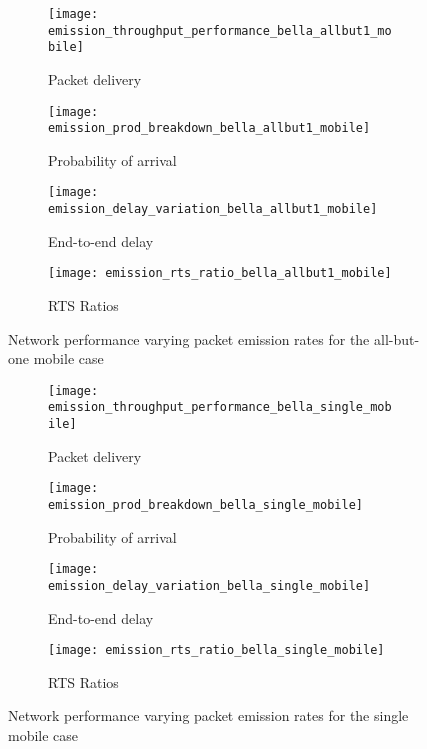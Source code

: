 \begin{figure}[tp!]
	\begin{subfigure}[t]{0.5\textwidth}
		\centering
		\texttt{[image: emission\_throughput\_performance\_bella\_allbut1\_mobile]}
		\caption{Packet delivery}
		\label{fig:emission_throughput_performance_bella_allbut1_mobile}
	\end{subfigure}
	\begin{subfigure}[t]{0.5\textwidth}
		\centering
		\texttt{[image: emission\_prod\_breakdown\_bella\_allbut1\_mobile]}
		\caption{Probability of arrival}
		\label{fig:emission_prod_breakdown_bella_allbut1_mobile}
	\end{subfigure}
	
	\begin{subfigure}[t]{0.5\textwidth}
		\centering
		\texttt{[image: emission\_delay\_variation\_bella\_allbut1\_mobile]}
		\caption{End-to-end delay}
		\label{fig:emission_delay_variation_bella_allbut1_mobile}
	\end{subfigure}
	\begin{subfigure}[t]{0.5\textwidth}
		\centering
		\texttt{[image: emission\_rts\_ratio\_bella\_allbut1\_mobile]}
		\caption{RTS Ratios}
		\label{fig:emission_rts_ratio_bella_allbut1_mobile}
	\end{subfigure}
	\caption{Network performance varying packet emission rates for the all-but-one mobile case}
	\label{fig:emission_bella_allbut1_mobile}
\end{figure}

\begin{figure}[bp!]
	\begin{subfigure}[t]{0.5\textwidth}
		\centering
		\texttt{[image: emission\_throughput\_performance\_bella\_single\_mobile]}
		\caption{Packet delivery}
		\label{fig:emission_throughput_performance_bella_single_mobile}
	\end{subfigure}
	\begin{subfigure}[t]{0.5\textwidth}
		\centering
		\texttt{[image: emission\_prod\_breakdown\_bella\_single\_mobile]}
		\caption{Probability of arrival}
		\label{fig:emission_prod_breakdown_bella_single_mobile}
	\end{subfigure}
	
	\begin{subfigure}[t]{0.5\textwidth}
		\centering
		\texttt{[image: emission\_delay\_variation\_bella\_single\_mobile]}
		\caption{End-to-end delay}
		\label{fig:emission_delay_variation_bella_single_mobile}
	\end{subfigure}
	\begin{subfigure}[t]{0.5\textwidth}
		\centering
		\texttt{[image: emission\_rts\_ratio\_bella\_single\_mobile]}
		\caption{RTS Ratios}
		\label{fig:emission_rts_ratio_bella_single_mobile}
	\end{subfigure}
	\caption{Network performance varying packet emission rates for the single mobile case}
	\label{fig:emission_bella_single_mobile}
\end{figure}

